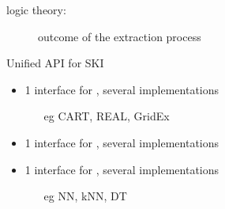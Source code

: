 \documentclass[presentation]{beamer}\mode<presentation>{\usetheme{AMSBolognaFC}}
\begin{document}
\begin{frame}[allowframebreaks]
\begin{description}
        \item[logic theory:] outcome of the extraction process
    \end{description}

    \begin{block}{Unified API for SKI}
        \begin{itemize}
            \item 1 interface for , several implementations
            \begin{itemize}
                \item[eg] CART, REAL, GridEx
            \end{itemize}
            \item 1 interface for , several implementations
            \item 1 interface for , several implementations
            \begin{itemize}
                \item[eg] NN, kNN, DT
            \end{itemize}
        \end{itemize}
    \end{block}
\end{frame}
\end{document}
